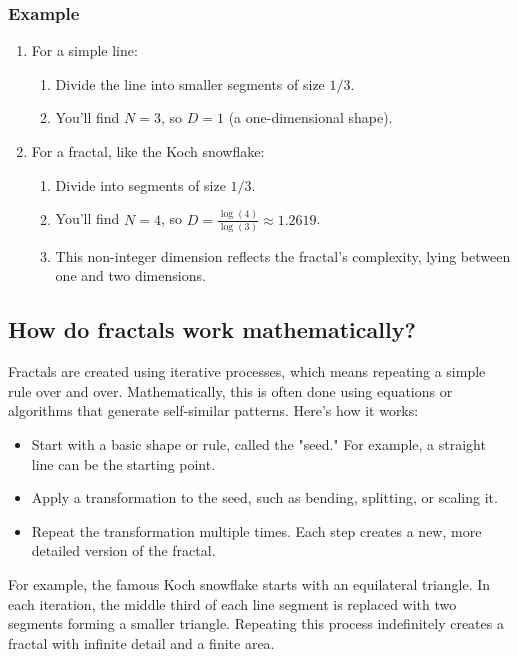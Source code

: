 \documentclass[12pt]{article}
\begin{document}
\subsubsection{Example}
\begin{enumerate}
    \item For a simple line:
	\begin{enumerate}
		\item Divide the line into smaller segments of size \(1/3\).
		\item You’ll find \(N = 3\), so \(D = 1\) (a one-dimensional shape).
\end{enumerate}
    \item For a fractal, like the Koch snowflake:
	\begin{enumerate}
		\item Divide into segments of size \(1/3\).
		\item You’ll find \(N = 4\), so \(D = \frac{\log(4)}{\log(3)} \approx 1.2619\).
		\item This non-integer dimension reflects the fractal's complexity, lying between one and two dimensions.
	\end{enumerate}
\end{enumerate}


\subsection{How do fractals work mathematically?}
Fractals are created using iterative processes, which means repeating a simple rule over and over. Mathematically, this is often done using equations or algorithms that generate self-similar patterns. Here’s how it works:
\begin{itemize}
    \item Start with a basic shape or rule, called the "seed." For example, a straight line can be the starting point.
    \item Apply a transformation to the seed, such as bending, splitting, or scaling it.
    \item Repeat the transformation multiple times. Each step creates a new, more detailed version of the fractal.
\end{itemize}

For example, the famous Koch snowflake starts with an equilateral triangle. In each iteration, the middle third of each line segment is replaced with two segments forming a smaller triangle. Repeating this process indefinitely creates a fractal with infinite detail and a finite area.
\end{document}
